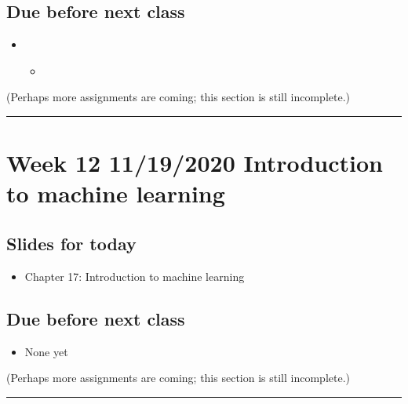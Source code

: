 \documentclass[letterpaper,10pt,english]{sphinxmanual}
\begin{document}
\subsection{Due before next class}
\label{\detokenize{course-schedule:id20}}\begin{itemize}
\item {} 
\begin{itemize}
\item {} 
{\hyperref[\detokenize{chapter-17-machine-learning::doc}]{}}

\end{itemize}

\end{itemize}

(Perhaps more assignments are coming; this section is still incomplete.)


\bigskip\hrule\bigskip



\section{Week 12 \sphinxhyphen{} 11/19/2020 \sphinxhyphen{} Introduction to machine learning}
\label{\detokenize{course-schedule:week-12-11-19-2020-introduction-to-machine-learning}}

\subsection{Slides for today}
\label{\detokenize{course-schedule:id21}}\begin{itemize}
\item {} 
Chapter 17: Introduction to machine learning

\end{itemize}


\subsection{Due before next class}
\label{\detokenize{course-schedule:id22}}\begin{itemize}
\item {} 
None yet

\end{itemize}

(Perhaps more assignments are coming; this section is still incomplete.)


\bigskip\hrule\bigskip
\end{document}
